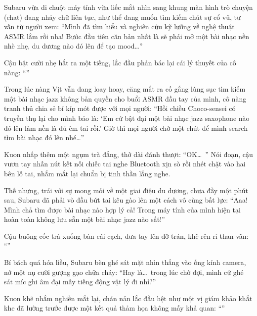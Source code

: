 \documentclass[../main.tex]{subfiles}
\begin{document}
Subaru vừa di chuột máy tính vừa liếc mắt nhìn sang khung màn hình trò chuyện (chat) đang nhảy chữ liên tục, như thể đang muốn tìm kiếm chút sự cổ vũ, tư vấn từ người xem: ``Mình đã tìm hiểu và nghiên cứu kỹ lưỡng về nghệ thuật ASMR lắm rồi nha! Bước đầu tiên căn bản nhất là sẽ phải mở một bài nhạc nền nhè nhẹ, du dương nào đó lên để tạo mood\dots''

Cậu bật cười nhẹ hắt ra một tiếng, lắc đầu phản bác lại cái lý thuyết của cô nàng: ``''

Trong lúc nàng Vịt vẫn đang loay hoay, căng mắt ra cố gắng lùng sục tìm kiếm một bài nhạc jazz không bản quyền cho buổi ASMR đầu tay của mình, cô nàng tranh thủ chia sẻ bí kíp mót được với mọi người: ``Hồi chiều Choco-sensei có truyền thụ lại cho mình bảo là: `Em cứ bật đại một bài nhạc jazz saxophone nào đó lên làm nền là đủ êm tai rồi.' Giờ thì mọi người chờ một chút để mình search tìm bài nhạc đó lên nhé\dots''

Kuon nhấp thêm một ngụm trà đắng, thở dài đánh thượt: ``OK\dots\ '' Nói đoạn, cậu vươn tay nhấn nút kết nối chiếc tai nghe Bluetooth xịn sò rồi nhét chặt vào hai bên lỗ tai, nhắm mắt lại chuẩn bị tinh thần lắng nghe.

Thế nhưng, trái với sự mong mỏi về một giai điệu du dương, chưa đầy một phút sau, Subaru đã phải vò đầu bứt tai kêu gào lên một cách vô cùng bất lực: ``Aaa! Mình chả tìm được bài nhạc nào hợp lý cả! Trong máy tính của mình hiện tại hoàn toàn không lưu sẵn một bài nhạc jazz nào sất!''


Cậu buông cốc trà xuống bàn cái cạch, đưa tay lên đỡ trán, khẽ rên rỉ than vãn: ``''

Bí bách quá hóa liều, Subaru bèn ghé sát mặt nhìn thẳng vào ống kính camera, nở một nụ cười gượng gạo chữa cháy: ``Hay là\dots\ trong lúc chờ đợi, mình cứ ghé sát míc ghi âm đại mấy tiếng động vật lý đi nhỉ?''

Kuon khẽ nhắm nghiền mắt lại, chán nản lắc đầu hệt như một vị giám khảo khắt khe đã lường trước được một kết quả thảm họa không mấy khả quan: ``''
\end{document}
